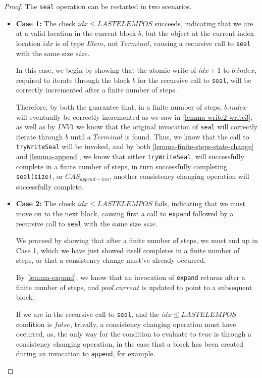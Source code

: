 \documentclass[runningheads,a4paper]{llncs}
\begin{document}
\begin{proof}
The \verb=seal= operation can be restarted in two scenarios. 

\begin{itemize}

\item \textbf{Case 1:} The check $idx \leq LASTELEMPOS$ succeeds, indicating
that we are at a valid location in the current block $b$, but the object at
the current index location $idx$ is of type $Elem$, not $Terminal$, causing a
recursive call to \verb=seal= with the same size $size$.

In this case, we begin by showing that the atomic write of $idx+1$ to
$b.index$, required to iterate through the block $b$ for the recursive call to
\verb=seal=, will be correctly incremented after a finite number of steps. 

Therefore, by both the guarantee that, in a finite number of steps, $b.index$
will eventually be correctly incremented as we saw in 
\ref{lemma-write2-write3}, as well as by $INV1$ we know that the original invocation of
\verb=seal= will correctly iterate through $b$ until a $Terminal$ is found.
Thus, we know that the call to \verb=tryWriteSeal= will be invoked, and by
both \ref{lemma-finite-steps-state-change} and \ref{lemma-append},
we know that either \verb=tryWriteSeal=, will successfully complete in a
finite number of steps, in turn successfully completing \verb=seal(size)=, or
$CAS_{append-inn}$, another consistency changing operation will successfully
complete.

\item \textbf{Case 2:} The check $idx \leq LASTELEMPOS$ fails, indicating that
we must move on to the next block, causing first a call to \verb=expand=
followed by a recursive call to \verb=seal= with the same size $size$.

We proceed by showing that after a finite number of steps, we must end up in
Case 1, which we have just showed itself completes in a finite number of
steps, or that a consistency change must've already occurred. 

By \ref{lemma-expand}, we know that an invocation of \verb=expand=
returns after a finite number of steps, and $pool.current$ is updated to point
to a subsequent block.

If we are in the recursive call to \verb=seal=, and the $idx \leq LASTELEMPOS$
condition is $false$, trivally, a consistency changing operation must have
occurred, as, the only way for the condition to evaluate to $true$ is through
a consistency changing operation, in the case that a block has been created
during an invocation to \verb=append=, for example.


\end{itemize}
\end{proof}
\end{document}
